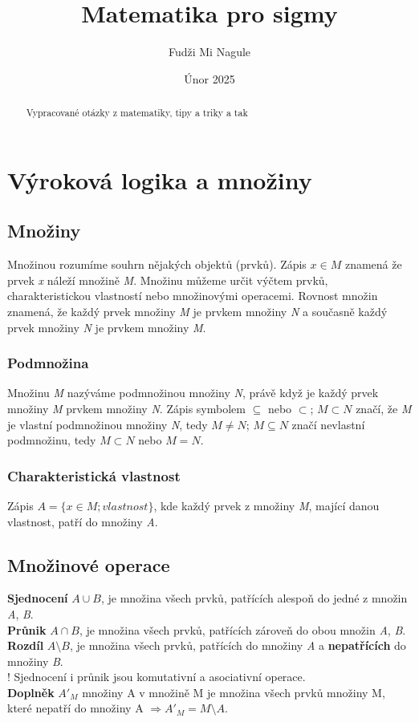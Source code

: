\documentclass[12pt, a4paper]{article}
\title{Matematika pro sigmy}
\author{Fudži Mi Nagule}
\date{Únor 2025}
\begin{document}
\maketitle
\pagebreak
\begin{abstract}
Vypracované otázky z matematiky, tipy a triky a tak
\end{abstract}
\pagebreak

\tableofcontents

\pagebreak
\section{Výroková logika a množiny}

\subsection*{Množiny}
Množinou rozumíme souhrn nějakých objektů (prvků). Zápis $x \in M$ znamená že prvek \textit{x} náleží množině \textit{M}. Množinu můžeme určit výčtem prvků, charakteristickou vlastností nebo 
množinovými operacemi. Rovnost množin znamená, že každý prvek množiny \textit{M} je prvkem množiny \textit{N} a současně každý prvek množiny \textit{N} je prvkem množiny \textit{M}.

\subsubsection*{Podmnožina}
Množinu \textit{M} nazýváme podmnožinou množiny \textit{N}, právě když je každý prvek množiny \textit{M} prvkem množiny \textit{N}. Zápis symbolem $\subseteq$ nebo $\subset$; $M\subset N$ značí, že \textit{M} je vlastní podmnožinou množiny \textit{N}, tedy $M \neq N$; $M \subseteq N$ značí nevlastní podmnožinu, tedy $M \subset N$ nebo $M = N$.

\subsubsection*{Charakteristická vlastnost}
Zápis $A=\{x \in M; vlastnost\}$, kde každý prvek z množiny \textit{M}, mající danou vlastnost, patří do množiny \textit{A}.

\subsection*{Množinové operace}
\textbf{Sjednocení} $A \cup B$, je množina všech prvků, patřících alespoň do jedné z množin \textit{A}, \textit{B}.\\
\textbf{Průnik} $A \cap B$, je množina všech prvků, patřících zároveň do obou množin \textit{A}, \textit{B}.\\
\textbf{Rozdíl} $A \setminus B$, je množina všech prvků, patřících do množiny \textit{A} a \textbf{nepatřících} do množiny \textit{B}.\\
! Sjednocení i průnik jsou komutativní a asociativní operace.\\
\textbf{Doplněk} $A'_M $ množiny A v množině M je množina všech prvků množiny M, které nepatří do množiny A $\Rightarrow A'_M = M \setminus A$.
\end{document}
